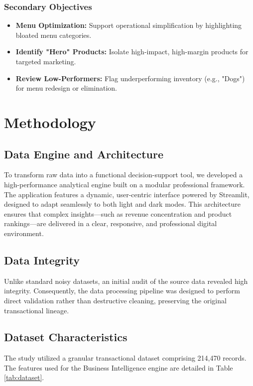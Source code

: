 \documentclass[12pt, a4paper]{article}
\begin{document}
	\subsubsection{Secondary Objectives}
	\begin{itemize}
		\item \textbf{Menu Optimization:} Support operational simplification by highlighting bloated menu categories.
		\item \textbf{Identify "Hero" Products:} Isolate high-impact, high-margin products for targeted marketing.
		\item \textbf{Review Low-Performers:} Flag underperforming inventory (e.g., "Dogs") for menu redesign or elimination.\\
	\end{itemize}
	
	\section{Methodology}
	\subsection{Data Engine and Architecture}
	To transform raw data into a functional decision-support tool, we developed a high-performance analytical engine built on a modular professional framework. The application features a dynamic, user-centric interface powered by Streamlit, designed to adapt seamlessly to both light and dark modes. This architecture ensures that complex insights—such as revenue concentration and product rankings—are delivered in a clear, responsive, and professional digital environment. 
	
	\subsection{Data Integrity}
	Unlike standard noisy datasets, an initial audit of the source data revealed high integrity. Consequently, the data processing pipeline was designed to perform direct validation rather than destructive cleaning, preserving the original transactional lineage.
	
	\subsection{Dataset Characteristics}
	The study utilized a granular transactional dataset comprising 214,470 records. The features used for the Business Intelligence engine are detailed in Table \ref{tab:dataset}.
	
\end{document}
